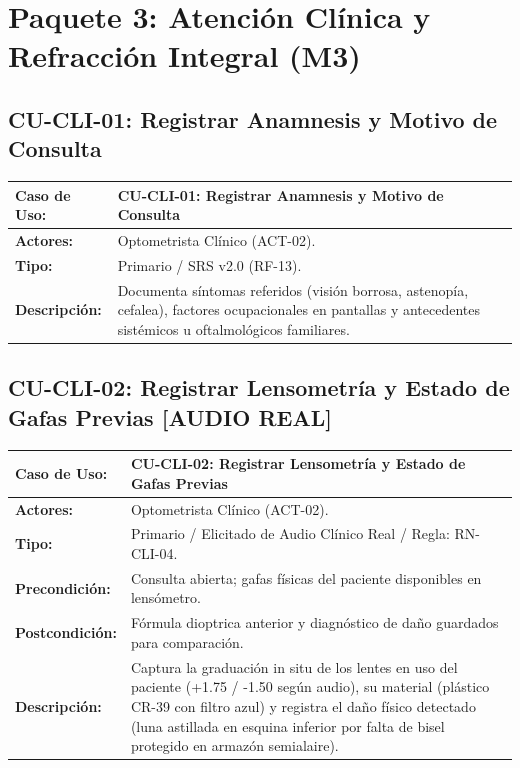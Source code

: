 \documentclass[12pt,a4paper]{report}
\begin{document}
\section{Paquete 3: Atención Clínica y Refracción Integral (M3)}

\subsection{CU-CLI-01: Registrar Anamnesis y Motivo de Consulta}
\begin{table}[H]
\centering
\small
\begin{tabularx}{\textwidth}{|L{3.5cm}|X|}
\hline
{}\color{white}\textbf{Caso de Uso:} & \textbf{CU-CLI-01: Registrar Anamnesis y Motivo de Consulta} \\
\hline
\textbf{Actores:} & Optometrista Clínico (ACT-02). \\
\hline
\textbf{Tipo:} & Primario / SRS v2.0 (RF-13). \\
\hline
\textbf{Descripción:} & Documenta síntomas referidos (visión borrosa, astenopía, cefalea), factores ocupacionales en pantallas y antecedentes sistémicos u oftalmológicos familiares. \\
\hline
\end{tabularx}
\end{table}

\subsection{CU-CLI-02: Registrar Lensometría y Estado de Gafas Previas [AUDIO REAL]}
\begin{table}[H]
\centering
\small
\begin{tabularx}{\textwidth}{|L{3.5cm}|X|}
\hline
{}\color{white}\textbf{Caso de Uso:} & \textbf{CU-CLI-02: Registrar Lensometría y Estado de Gafas Previas} \\
\hline
\textbf{Actores:} & Optometrista Clínico (ACT-02). \\
\hline
\textbf{Tipo:} & Primario / Elicitado de Audio Clínico Real / Regla: RN-CLI-04. \\
\hline
\textbf{Precondición:} & Consulta abierta; gafas físicas del paciente disponibles en lensómetro. \\
\hline
\textbf{Postcondición:} & Fórmula dioptrica anterior y diagnóstico de daño guardados para comparación. \\
\hline
\textbf{Descripción:} & Captura la graduación in situ de los lentes en uso del paciente (+1.75 / -1.50 según audio), su material (plástico CR-39 con filtro azul) y registra el daño físico detectado (luna astillada en esquina inferior por falta de bisel protegido en armazón semialaire). \\
\hline
\end{tabularx}
\end{table}
\end{document}

